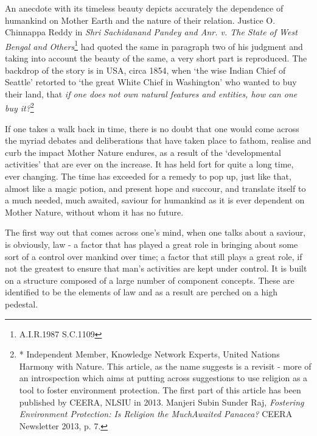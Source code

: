 \setcounter{figure}{0}
\setcounter{table}{0}
\setcounter{footnote}{0}

\label{2017-art2}

\begin{multicols}{2}


\noi
An anecdote with its timeless beauty depicts accurately the dependence of humankind on
Mother Earth and the nature of their relation. Justice O. Chinnappa Reddy in \textit{Shri Sachidanand
Pandey and Anr. v. The State of West Bengal and Others}\footnote{A.I.R.1987 S.C.1109} had quoted the same in paragraph two of his judgment and taking into account the beauty of the same, a very short part is reproduced. The backdrop of the story is in USA, circa 1854, when ‘the wise Indian Chief of Seattle’ retorted to ‘the great White Chief in Washington’ who wanted to buy their land, that \textit{if one does not own natural features and entities, how can one buy it?}\footnote{* Independent Member, Knowledge Network Experts, United Nations Harmony with Nature. This article, as the name suggests is a revisit - more of an introspection which aims at putting across suggestions to use religion as a tool to foster environment protection. The first part of this article has been published by CEERA, NLSIU in 2013. Manjeri Subin Sunder Raj, \textit{Fostering Environment Protection: Is Religion the MuchAwaited Panacea?} CEERA Newsletter 2013, p. 7.}

\noi
If one takes a walk back in time, there is no doubt that one would come across the myriad
debates and deliberations that have taken place to fathom, realise and curb the impact Mother
Nature endures, as a result of the ‘developmental activities’ that are ever on the increase. It has
held fort for quite a long time, ever changing. The time has exceeded for a remedy to pop up,
just like that, almost like a magic potion, and present hope and succour, and translate itself to
a much needed, much awaited, saviour for humankind as it is ever dependent on Mother Nature,
without whom it has no future.

\noi
The first way out that comes across one’s mind, when one talks about a saviour, is obviously, law - a factor that has played a great role in bringing about some sort of a control over mankind over time; a factor that still plays a great role, if not the greatest to ensure that man’s activities are kept under control. It is built on a structure composed of a large number of component concepts. These are identified to be the elements of law and as a result are perched on a high pedestal.


\end{multicols}
